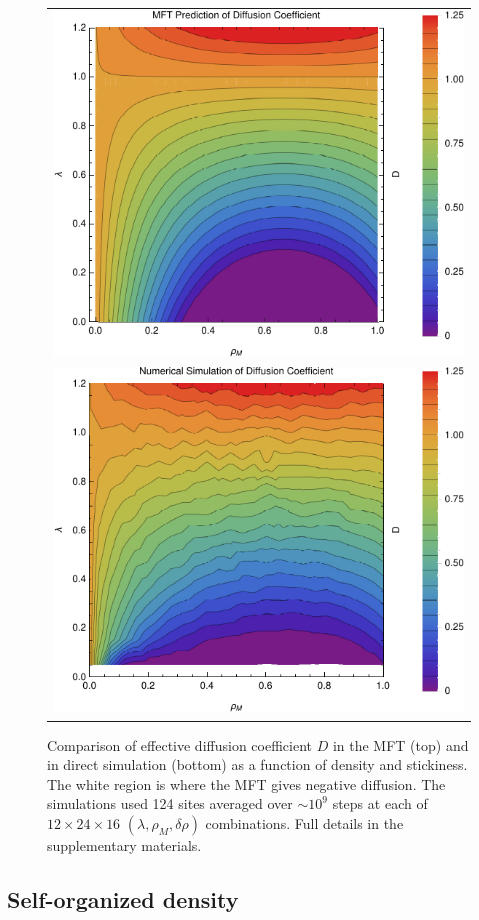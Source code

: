 \documentclass[
reprint, amsmath,amssymb, aps,
 prx,
]{revtex4-1}
\begin{document}
\begin{figure}[h!]
\vspace{1em}
\begin{center}
 \begin{tabular}{c}
    \includegraphics[width=0.7\linewidth]{newAnalFlow} \\
    \includegraphics[width=0.7\linewidth]{newDataFlow}
    \end{tabular}
\end{center}
\caption{\label{fig:diffCoef}
Comparison of effective diffusion coefficient $D$ in the MFT (top) and in direct simulation (bottom) as a function of density and stickiness.
The white region is where the MFT gives negative diffusion. The simulations used 124 sites averaged over $\sim 10^9$ steps at each of $12 \times 24 \times 16 $ $(\lambda, \rho_M, \delta \rho)$ combinations.  
Full details in the supplementary materials.}
    \vspace{-2em}
\end{figure}


\subsection{Self-organized density}
\end{document}

